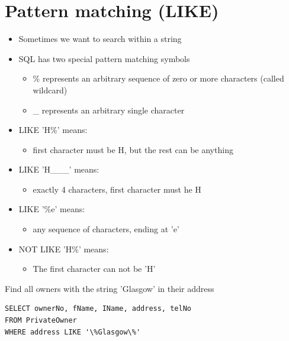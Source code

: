 \documentclass{article}[18pt]
\begin{document}
\section{Pattern matching (LIKE)}
\begin{itemize}
	\item Sometimes we want to search within a string
	\item SQL has two special pattern matching symbols
	\begin{itemize}
		\item \% represents an arbitrary sequence of zero or more characters (called wildcard)
		\item \_ represents an arbitrary single character
	\end{itemize}
	\item LIKE 'H\%' means:
	\begin{itemize}
		\item first character must be H, but the rest can be anything
	\end{itemize}
	\item LIKE 'H\_\_\_' means:
	\begin{itemize}
		\item exactly 4 characters, first character must he H
	\end{itemize}
	\item LIKE '\%e' means:
	\begin{itemize}
		\item any sequence of characters, ending at 'e'
	\end{itemize}
	\item NOT LIKE 'H\%' means:
	\begin{itemize}
		\item The first character can not be 'H'
	\end{itemize}
\end{itemize}
Find all owners with the string 'Glasgow' in their address
\begin{verbatim}
SELECT ownerNo, fName, IName, address, telNo
FROM PrivateOwner
WHERE address LIKE '\%Glasgow\%'
\end{verbatim}
\end{document}
